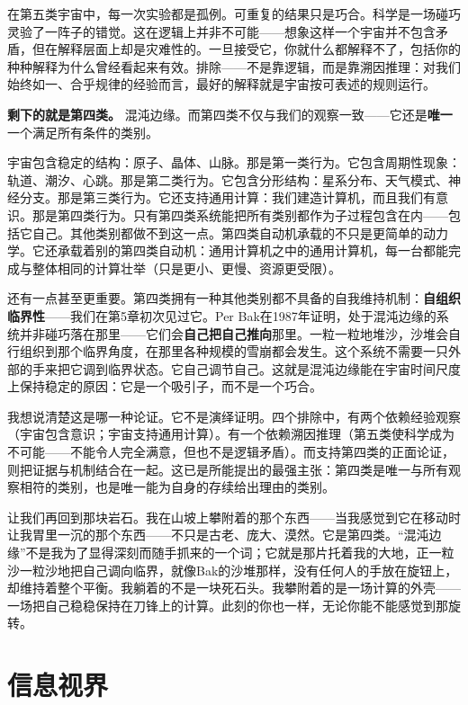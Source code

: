 \documentclass[11pt, twoside, openright]{book}
\begin{document}
在第五类宇宙中，每一次实验都是孤例。可重复的结果只是巧合。科学是一场碰巧灵验了一阵子的错觉。这在逻辑上并非不可能------想象这样一个宇宙并不包含矛盾，但在解释层面上却是灾难性的。一旦接受它，你就什么都解释不了，包括你的种种解释为什么曾经看起来有效。排除------不是靠逻辑，而是靠溯因推理：对我们始终如一、合乎规律的经验而言，最好的解释就是宇宙按可表述的规则运行。

\textbf{剩下的就是第四类。} 混沌边缘。而第四类不仅与我们的观察一致------它还是\textbf{唯一}一个满足所有条件的类别。

宇宙包含稳定的结构：原子、晶体、山脉。那是第一类行为。它包含周期性现象：轨道、潮汐、心跳。那是第二类行为。它包含分形结构：星系分布、天气模式、神经分支。那是第三类行为。它还支持通用计算：我们建造计算机，而且我们有意识。那是第四类行为。只有第四类系统能把所有类别都作为子过程包含在内------包括它自己。其他类别都做不到这一点。第四类自动机承载的不只是更简单的动力学。它还承载着别的第四类自动机：通用计算机之中的通用计算机，每一台都能完成与整体相同的计算壮举（只是更小、更慢、资源更受限）。

还有一点甚至更重要。第四类拥有一种其他类别都不具备的自我维持机制：\textbf{自组织临界性}------我们在第5章初次见过它。Per Bak在1987年证明，处于混沌边缘的系统并非碰巧落在那里------它们会\textbf{自己把自己推向}那里。一粒一粒地堆沙，沙堆会自行组织到那个临界角度，在那里各种规模的雪崩都会发生。这个系统不需要一只外部的手来把它调到临界状态。它自己调节自己。这就是混沌边缘能在宇宙时间尺度上保持稳定的原因：它是一个吸引子，而不是一个巧合。

我想说清楚这是哪一种论证。它不是演绎证明。四个排除中，有两个依赖经验观察（宇宙包含意识；宇宙支持通用计算）。有一个依赖溯因推理（第五类使科学成为不可能------不能令人完全满意，但也不是逻辑矛盾）。而支持第四类的正面论证，则把证据与机制结合在一起。这已是所能提出的最强主张：第四类是唯一与所有观察相符的类别，也是唯一能为自身的存续给出理由的类别。

让我们再回到那块岩石。我在山坡上攀附着的那个东西------当我感觉到它在移动时让我胃里一沉的那个东西------不只是古老、庞大、漠然。它是第四类。“混沌边缘”不是我为了显得深刻而随手抓来的一个词；它就是那片托着我的大地，正一粒沙一粒沙地把自己调向临界，就像Bak的沙堆那样，没有任何人的手放在旋钮上，却维持着整个平衡。我躺着的不是一块死石头。我攀附着的是一场计算的外壳------一场把自己稳稳保持在刀锋上的计算。此刻的你也一样，无论你能不能感觉到那旋转。


\section*{信息视界}
\end{document}

